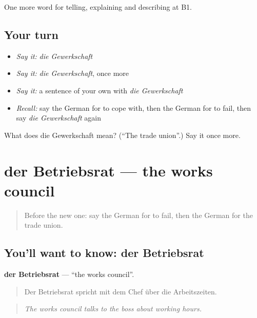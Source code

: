 \begin{grammarlens}[title={What you've built}]
One more word for telling, explaining and describing at B1.
\end{grammarlens}

\subsection*{Your turn}
\begin{itemize}
\raggedright
  \item \emph{Say it:} \emph{die Gewerkschaft}
  \item \emph{Say it:} \emph{die Gewerkschaft}, once more
  \item \emph{Say it:} a sentence of your own with \emph{die Gewerkschaft}
  \item \emph{Recall:} say the German for to cope with, then the German for to fail, then say \emph{die Gewerkschaft} again
\end{itemize}

\begin{tcolorbox}[breakable,colback=teal!4,colframe=teal!35!black,title={Before you move on}]
What does die Gewerkschaft mean? (\textquotedblleft{}The trade union\textquotedblright{}.) Say it once more.
\end{tcolorbox}
\section[der Betriebsrat]{der Betriebsrat — the works council}

\label{lesson:GE-C357-betriebsrat}



\begin{quote}
Before the new one: say the German for to fail, then the German for the trade union.
\end{quote}

\subsection*{You'll want to know: der Betriebsrat}
\textbf{der Betriebsrat} — \textquotedblleft{}the works council\textquotedblright{}.

\begin{quote}
Der Betriebsrat spricht mit dem Chef über die Arbeitszeiten.
\end{quote}

\begin{quote}
\emph{The works council talks to the boss about working hours.}
\end{quote}

